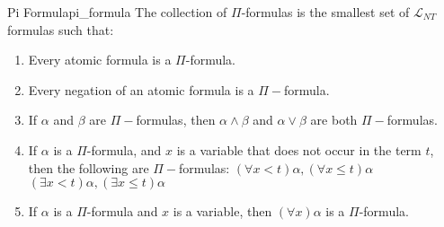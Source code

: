 \begin{definition}{Pi Formula}{pi_formula}
The collection of $\Pi$-formulas is the smallest set of $\mathcal{L}_{N T}$ formulas such that:
\begin{enumerate}
    \item Every atomic formula is a $\Pi$-formula.
    \item Every negation of an atomic formula is a $\Pi-$formula.
    \item If $\alpha$ and $\beta$ are $\Pi-$formulas, then $\alpha \wedge \beta$ and $\alpha \vee \beta$ are both $\Pi-$formulas.
    \item If $\alpha$ is a $\Pi$-formula, and $x$ is a variable that does not occur in the term $t$, then the following are $\Pi-$formulas: $(\forall x<t) \alpha,(\forall x \leq t) \alpha$ $(\exists x<t) \alpha,(\exists x \leq t) \alpha$
    \item If $\alpha$ is a $\Pi$-formula and $x$ is a variable, then $(\forall x) \alpha$ is a $\Pi$-formula.
\end{enumerate}
\end{definition}
